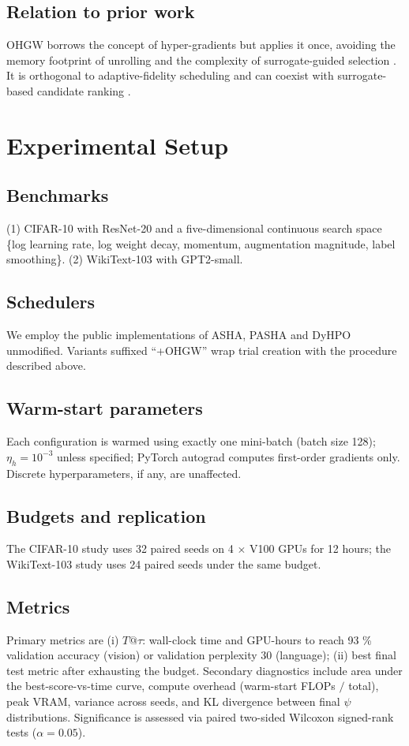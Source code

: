 \documentclass{article}
\begin{document}
\subsection{Relation to prior work}
OHGW borrows the concept of hyper-gradients but applies it once, avoiding the memory footprint of unrolling \cite{bertrand-2020-implicit} and the complexity of surrogate-guided selection \cite{nguyen-2019-bayesian}. It is orthogonal to adaptive-fidelity scheduling \cite{jiang-2024-efficient} and can coexist with surrogate-based candidate ranking \cite{khazi-2023-deep}.

\section{Experimental Setup}
\subsection{Benchmarks}
(1) CIFAR-10 with ResNet-20 and a five-dimensional continuous search space \{log learning rate, log weight decay, momentum, augmentation magnitude, label smoothing\}. (2) WikiText-103 with GPT2-small.

\subsection{Schedulers}
We employ the public implementations of ASHA, PASHA and DyHPO \cite{bohdal-2022-pasha,wistuba-2022-supervising} unmodified. Variants suffixed ``+OHGW'' wrap trial creation with the procedure described above.

\subsection{Warm-start parameters}
Each configuration is warmed using exactly one mini-batch (batch size 128); \(\eta_h = 10^{-3}\) unless specified; PyTorch autograd computes first-order gradients only. Discrete hyperparameters, if any, are unaffected.

\subsection{Budgets and replication}
The CIFAR-10 study uses 32 paired seeds on 4 \(\times\) V100 GPUs for 12 hours; the WikiText-103 study uses 24 paired seeds under the same budget.

\subsection{Metrics}
Primary metrics are (i) \(T@\tau\): wall-clock time and GPU-hours to reach 93 \% validation accuracy (vision) or validation perplexity 30 (language); (ii) best final test metric after exhausting the budget. Secondary diagnostics include area under the best-score-vs-time curve, compute overhead (warm-start FLOPs \(/\) total), peak VRAM, variance across seeds, and KL divergence between final \(\psi\) distributions. Significance is assessed via paired two-sided Wilcoxon signed-rank tests (\(\alpha = 0.05\)).
\end{document}
